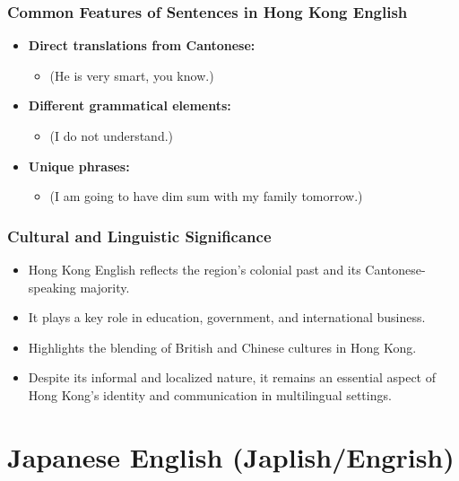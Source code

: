 \documentclass{beamer}
\begin{document}
\begin{frame}
\frametitle{Common Features of Sentences in Hong Kong English}
\begin{itemize}
    \item \textbf{Direct translations from Cantonese:}
    \begin{itemize}
        \item {} (He is very smart, you know.)
    \end{itemize}
    \item \textbf{Different grammatical elements:}
    \begin{itemize}
        \item {} (I do not understand.)
    \end{itemize}
    \item \textbf{Unique phrases:}
    \begin{itemize}
        \item {} (I am going to have dim sum with my family tomorrow.)
    \end{itemize}
\end{itemize}
\end{frame}

\begin{frame}
\frametitle{Cultural and Linguistic Significance}
\begin{itemize}
    \item Hong Kong English reflects the region's colonial past and its Cantonese-speaking majority.
    \item It plays a key role in education, government, and international business.
    \item Highlights the blending of British and Chinese cultures in Hong Kong.
    \item Despite its informal and localized nature, it remains an essential aspect of Hong Kong's identity and communication in multilingual settings.
\end{itemize}
\end{frame}


\section{Japanese English (Japlish/Engrish)}
\end{document}
